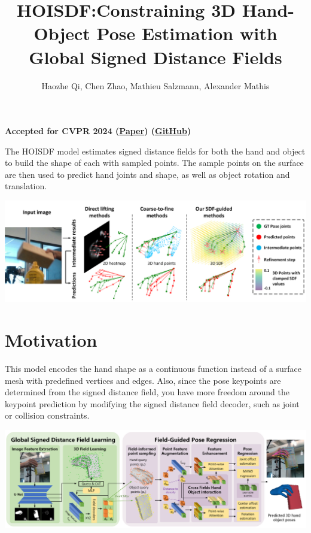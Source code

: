 \documentclass{article}
\title{HOISDF:\@ Constraining 3D Hand-Object Pose Estimation with Global Signed Distance Fields}
\author{Haozhe Qi, Chen Zhao, Mathieu Salzmann, Alexander Mathis}
\date{}
\begin{document}
\maketitle

\begin{center}\textbf{Accepted for CVPR 2024 (\href{https://arxiv.org/pdf/2402.17062}{Paper}) (\href{https://github.com/amathislab/HOISDF}{GitHub})}\end{center}

The HOISDF model estimates signed distance fields for both the hand and object to build the shape
of each with sampled points. The sample points on the surface are then used to predict hand joints
and shape, as well as object rotation and translation.

\begin{center}
    \includegraphics[scale=0.4]{hoisdf-1.png}
\end{center}

\section*{Motivation}
This model encodes the hand shape as a continuous function instead of a surface mesh with predefined vertices and edges. Also, since the pose keypoints are determined from the signed distance field, you have more freedom around the keypoint prediction by modifying the signed distance field decoder, such as joint or collision constraints.

\begin{center}
    \includegraphics[scale=0.4]{hoisdf-2.png}
\end{center}
\end{document}
